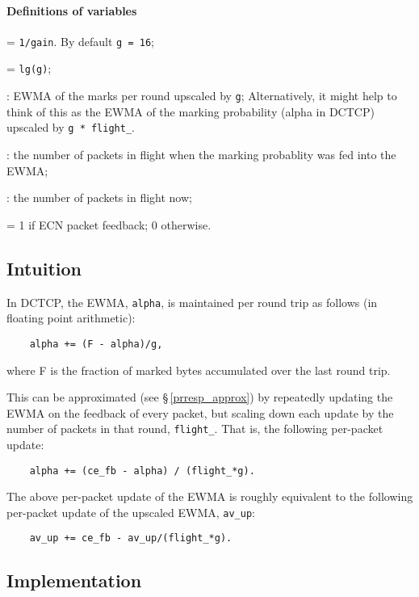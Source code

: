 \paragraph{Definitions of variables}
\begin{description}[nosep]
	\item [\texttt{g}] = \texttt{1/gain}. By default \texttt{g = 16};
	\item [\texttt{g\_shift}] = \texttt{lg(g)};
	\item [\texttt{av\_up}]: EWMA of the marks per round upscaled by \texttt{g}; Alternatively, it might help to think of this as the EWMA of the marking probability (alpha in DCTCP) upscaled by \texttt{g * flight\_}. 
	\item [\texttt{flight\_}]: the number of packets in flight when the marking probablity was fed into the EWMA;
	\item [\texttt{flight}]: the number of packets in flight now;
	\item [\texttt{ce\_fb}] = 1 if ECN packet feedback; 0 otherwise.
\end{description}

\subsection{Intuition}\label{prresp_intuition}

In DCTCP, the EWMA, \texttt{alpha}, is maintained per round trip as follows (in floating point arithmetic):
\begin{verbatim}
    alpha += (F - alpha)/g,
\end{verbatim}
where F is the fraction of marked bytes accumulated over the last round trip.

This can be approximated (see \S\,\ref{prresp_approx}) by repeatedly updating the EWMA on the feedback of every packet, but scaling down each update by the number of packets in that round, \texttt{flight\_}. That is, the following per-packet update:
\begin{verbatim}
    alpha += (ce_fb - alpha) / (flight_*g).
\end{verbatim}

The above per-packet update of the EWMA is roughly equivalent to the following per-packet update of the upscaled EWMA, \texttt{av\_up}:
\begin{verbatim}
    av_up += ce_fb - av_up/(flight_*g).
\end{verbatim}

\subsection{Implementation}\label{prresp_implementation}

